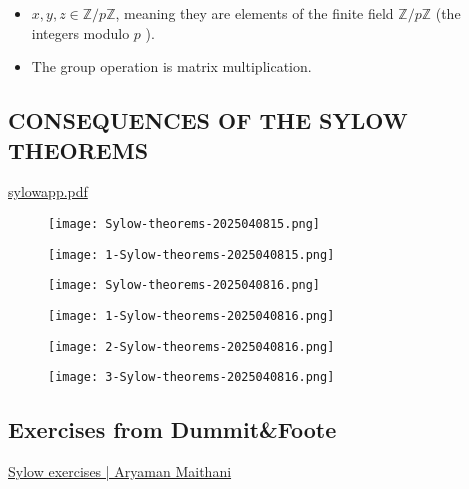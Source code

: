 \begin{itemize}
	\item $x, y, z \in \mathbb{Z} / p \mathbb{Z}$, meaning they are elements of the finite field $\mathbb{Z} / p \mathbb{Z}$ (the integers modulo $p$ ).
	\item The group operation is matrix multiplication.
\end{itemize}

\subsection{CONSEQUENCES OF THE SYLOW THEOREMS}

\href{https://kconrad.math.uconn.edu/blurbs/grouptheory/sylowapp.pdf}{sylowapp.pdf}
\begin{figure}[H]
\centering
\texttt{[image: Sylow-theorems-2025040815.png]}
\label{}
\end{figure}
\begin{figure}[H]
\centering
\texttt{[image: 1-Sylow-theorems-2025040815.png]}
\label{}
\end{figure}
\begin{figure}[H]
\centering
\texttt{[image: Sylow-theorems-2025040816.png]}
\label{}
\end{figure}
\begin{figure}[H]
\centering
\texttt{[image: 1-Sylow-theorems-2025040816.png]}
\label{}
\end{figure}
\begin{figure}[H]
\centering
\texttt{[image: 2-Sylow-theorems-2025040816.png]}
\label{}
\end{figure}
\begin{figure}[H]
\centering
\texttt{[image: 3-Sylow-theorems-2025040816.png]}
\label{}
\end{figure}

\subsection{Exercises from Dummit\&Foote}

\href{https://aryamanmaithani.github.io/alg/groups/sylow-exercises/}{Sylow exercises | Aryaman Maithani}


